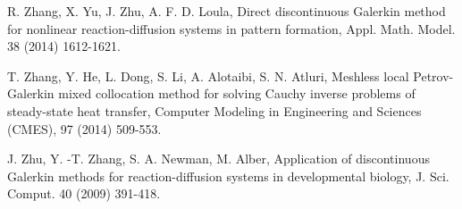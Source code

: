 \documentclass[12pt]{article}
\numberwithin{equation}{section}
\begin{document}
\begin{thebibliography}{99}
 R. Zhang, X. Yu, J. Zhu, A. F. D. Loula, Direct discontinuous Galerkin method for nonlinear
reaction-diffusion systems in pattern formation, Appl. Math. Model.  38 (2014) 1612-1621.

 T. Zhang, Y. He, L. Dong, S. Li, A. Alotaibi, S. N. Atluri, Meshless local Petrov-Galerkin mixed collocation method for 
solving Cauchy inverse problems of steady-state heat transfer, Computer Modeling in Engineering and Sciences (CMES), 97 (2014) 509-553.

 J. Zhu, Y. -T. Zhang, S. A. Newman, M. Alber, Application of discontinuous Galerkin methods
for reaction-diffusion systems in developmental biology, J. Sci. Comput. 40 (2009) 391-418.

\end{thebibliography}
\end{document}
